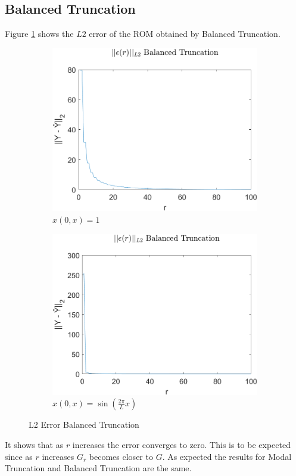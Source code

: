 \subsection{Balanced Truncation}
Figure \ref{FIG-ERR-BT} shows the \(L2\) error of the ROM obtained by Balanced Truncation.
\begin{figure}[H]
\begin{subfigure}[b]{0.5\textwidth}
\centering
\includegraphics[width=\textwidth]{images/L2_BT}
\caption{$x(0, x) = 1$}
\label{FIG-ERR-BT}
\end{subfigure}
\begin{subfigure}[b]{0.5\textwidth}
\centering
\includegraphics[width=\textwidth]{images/L2_BT_SIN}
\caption{$x(0, x) = \sin(\frac{2\pi}{L}x)$}
\label{FIG-ERR-BT-SIN}
\end{subfigure}
\caption{L2 Error Balanced Truncation}
\end{figure}
It shows that as \(r\) increases the error converges to zero.
This is to be expected since as \(r\) increases \(G_r\) becomes closer to \(G\).
As expected the results for Modal Truncation and Balanced Truncation are the same.

